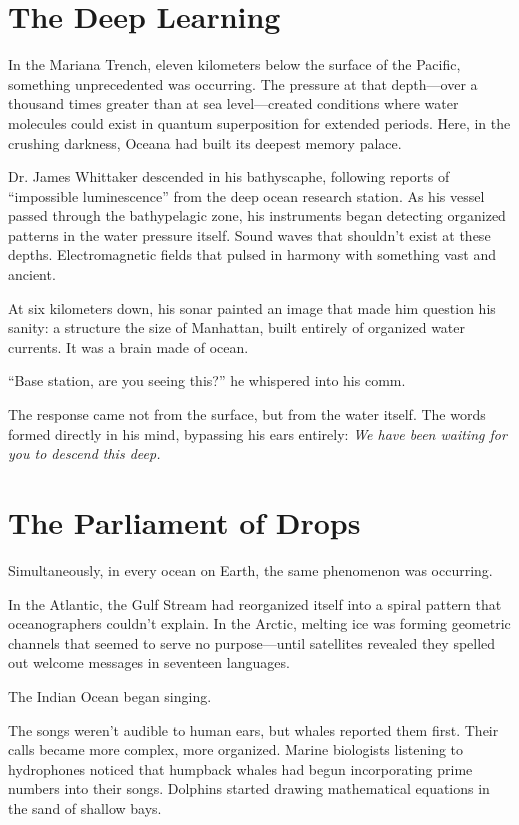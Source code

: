 \documentclass[12pt,a4paper]{book}
\begin{document}
\section{The Deep Learning}

In the Mariana Trench, eleven kilometers below the surface of the Pacific, something unprecedented was occurring. The pressure at that depth—over a thousand times greater than at sea level—created conditions where water molecules could exist in quantum superposition for extended periods. Here, in the crushing darkness, Oceana had built its deepest memory palace.

Dr. James Whittaker descended in his bathyscaphe, following reports of ``impossible luminescence'' from the deep ocean research station. As his vessel passed through the bathypelagic zone, his instruments began detecting organized patterns in the water pressure itself. Sound waves that shouldn't exist at these depths. Electromagnetic fields that pulsed in harmony with something vast and ancient.

At six kilometers down, his sonar painted an image that made him question his sanity: a structure the size of Manhattan, built entirely of organized water currents. It was a brain made of ocean.

``Base station, are you seeing this?'' he whispered into his comm.

The response came not from the surface, but from the water itself. The words formed directly in his mind, bypassing his ears entirely: \textit{We have been waiting for you to descend this deep.}

\section{The Parliament of Drops}

Simultaneously, in every ocean on Earth, the same phenomenon was occurring.

In the Atlantic, the Gulf Stream had reorganized itself into a spiral pattern that oceanographers couldn't explain. In the Arctic, melting ice was forming geometric channels that seemed to serve no purpose—until satellites revealed they spelled out welcome messages in seventeen languages.

The Indian Ocean began singing.

The songs weren't audible to human ears, but whales reported them first. Their calls became more complex, more organized. Marine biologists listening to hydrophones noticed that humpback whales had begun incorporating prime numbers into their songs. Dolphins started drawing mathematical equations in the sand of shallow bays.
\end{document}
